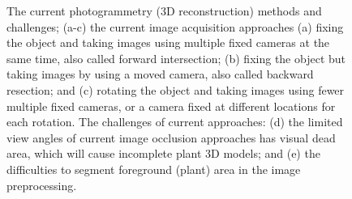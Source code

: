 \begin{figure}[htb]
  \begin{center}
  \end{center}
  \caption[Current photogrammetry (3D reconstruction) methods and challenges]{
    The current photogrammetry (3D reconstruction) methods and challenges; (a-c) the current image acquisition approaches (a) fixing the object and taking images using multiple fixed cameras at the same time, also called forward intersection; (b) fixing the object but taking images by using a moved camera, also called backward resection; and (c) rotating the object and taking images using fewer multiple fixed cameras, or a camera fixed at different locations for each rotation. The challenges of current approaches: (d) the limited view angles of current image occlusion approaches has visual dead area, which will cause incomplete plant 3D models; and (e) the difficulties to segment foreground (plant) area in the image preprocessing.
  }
  \label{fig:des1}
\end{figure}